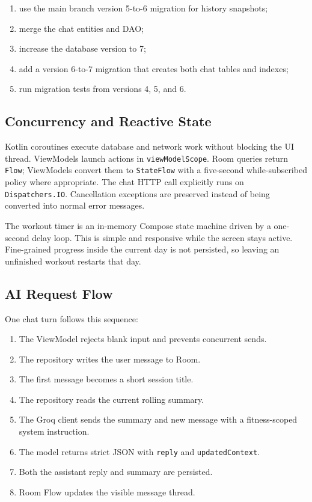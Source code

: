 \begin{enumerate}
    \item use the main branch version 5-to-6 migration for history snapshots;
    \item merge the chat entities and DAO;
    \item increase the database version to 7;
    \item add a version 6-to-7 migration that creates both chat tables and indexes;
    \item run migration tests from versions 4, 5, and 6.
\end{enumerate}

\subsection{Concurrency and Reactive State}

Kotlin coroutines execute database and network work without blocking the UI thread. ViewModels launch actions in \texttt{viewModelScope}. Room queries return \texttt{Flow}; ViewModels convert them to \texttt{StateFlow} with a five-second while-subscribed policy where appropriate. The chat HTTP call explicitly runs on \texttt{Dispatchers.IO}. Cancellation exceptions are preserved instead of being converted into normal error messages.

The workout timer is an in-memory Compose state machine driven by a one-second delay loop. This is simple and responsive while the screen stays active. Fine-grained progress inside the current day is not persisted, so leaving an unfinished workout restarts that day.

\subsection{AI Request Flow}

One chat turn follows this sequence:

\begin{enumerate}
    \item The ViewModel rejects blank input and prevents concurrent sends.
    \item The repository writes the user message to Room.
    \item The first message becomes a short session title.
    \item The repository reads the current rolling summary.
    \item The Groq client sends the summary and new message with a fitness-scoped system instruction.
    \item The model returns strict JSON with \texttt{reply} and \texttt{updatedContext}.
    \item Both the assistant reply and summary are persisted.
    \item Room Flow updates the visible message thread.
\end{enumerate}

